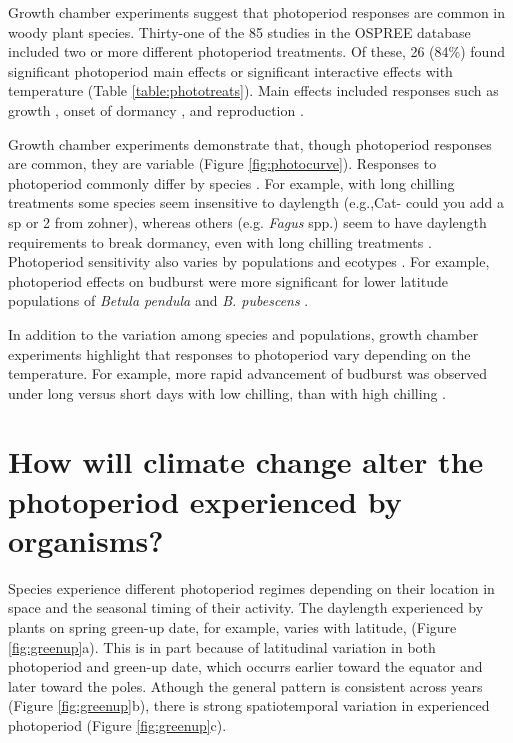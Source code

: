 \documentclass{article}
\begin{document}
\par Growth chamber experiments suggest that photoperiod responses are common in woody plant species. Thirty-one of the 85 studies in the OSPREE database included two or more different photoperiod treatments. Of these, 26 (84\%) found significant photoperiod main effects or significant interactive effects with temperature (Table \ref{table:phototreats}). Main effects included responses such as growth \citep[e.g., higher growth rates with longer days ][]{Ashby:1962aa}, onset of dormancy \citep[e.g., more rapid induction of budset with shorter days][]{Howe:1995aa}, and reproduction \citep[e.g., increased flowering with longer days ][]{Heide:2012aa}. 
\par Growth chamber experiments demonstrate that, though photoperiod responses are common, they are variable (Figure \ref{fig:photocurve}). Responses to photoperiod commonly differ by species \citep[e.g.,][]{Heide:1993a,Howe:1996,Basler:2012, Basler:2014aa,zohner2016,flynn2018}. For example, with long chilling treatments some species seem insensitive to daylength (e.g.,Cat- could you add a sp or 2 from zohner), whereas others (e.g. \emph{Fagus} spp.) seem to have daylength requirements to break dormancy, even with long chilling treatments \citep{zohner2016}. %
Photoperiod sensitivity also varies by populations and ecotypes  \citep[e.g.,][]{Partanen:2005aa,flynn2018}. For example, photoperiod effects on budburst were  more significant for lower latitude populations of \emph{Betula pendula} and \emph{B. pubescens} \citep{Partanen:2005aa}.
\par In addition to the variation among species and populations, growth chamber experiments highlight that responses to photoperiod vary depending on the temperature. For example, more rapid advancement of budburst was observed under long versus short days with low chilling, than with high chilling \citep{Hawkins:2012}. 

\section*{How will climate change alter the photoperiod experienced by organisms?}
\par Species experience different photoperiod regimes depending on their location in space and the seasonal timing of their activity. The daylength experienced by plants on spring green-up date, for example, varies with latitude, (Figure \ref{fig:greenup}a). This is in part because of latitudinal variation in both photoperiod and green-up date, which occurrs earlier toward the equator and later toward the poles. Athough the general pattern is consistent across years (Figure \ref{fig:greenup}b), there is strong spatiotemporal variation in experienced photoperiod (Figure \ref{fig:greenup}c).%
\end{document}

